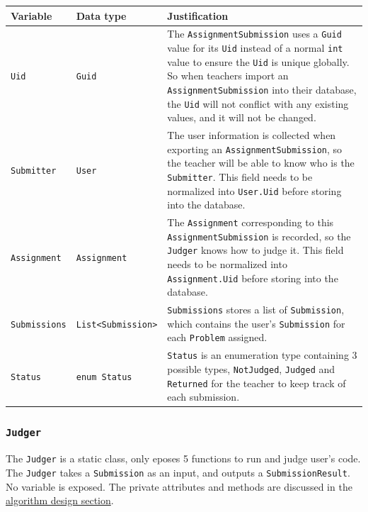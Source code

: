 \documentclass[a4paper]{report}
\begin{document}
\begin{tabulary}{\textwidth}{|l|l|L|}
    \hline
    Variable & Data type & Justification \\
    \hline
    \texttt{Uid} & \texttt{Guid} & The \texttt{AssignmentSubmission} uses a \texttt{Guid} value for its \texttt{Uid} instead of a normal \texttt{int} value to ensure the \texttt{Uid} is unique globally. So when teachers import an \texttt{AssignmentSubmission} into their database, the \texttt{Uid} will not conflict with any existing values, and it will not be changed. \\
    \hline
    \texttt{Submitter} & \texttt{User} & The user information is collected when exporting an \texttt{AssignmentSubmission}, so the teacher will be able to know who is the \texttt{Submitter}. This field needs to be normalized into \texttt{User.Uid} before storing into the database. \\
    \hline
    \texttt{Assignment} & \texttt{Assignment} & The \texttt{Assignment} corresponding to this \texttt{AssignmentSubmission} is recorded, so the \texttt{Judger} knows how to judge it. This field needs to be normalized into \texttt{Assignment.Uid} before storing into the database. \\
    \hline
    \texttt{Submissions} & \texttt{List<Submission>} & \texttt{Submissions} stores a list of \texttt{Submission}, which contains the user's \texttt{Submission} for each \texttt{Problem} assigned. \\
    \hline
    \texttt{Status} & \texttt{enum Status} & \texttt{Status} is an enumeration type containing 3 possible types, \texttt{NotJudged}, \texttt{Judged} and \texttt{Returned} for the teacher to keep track of each submission. \\
    \hline
\end{tabulary}

\subsubsection{\texttt{Judger}}

The \texttt{Judger} is a static class, only eposes 5 functions to run and judge user's code. The \texttt{Judger} takes a \texttt{Submission} as an input, and outputs a \texttt{SubmissionResult}. No variable is exposed. The private attributes and methods are discussed in the \hyperref[sec:algorithm design]{algorithm design section}.
\end{document}
